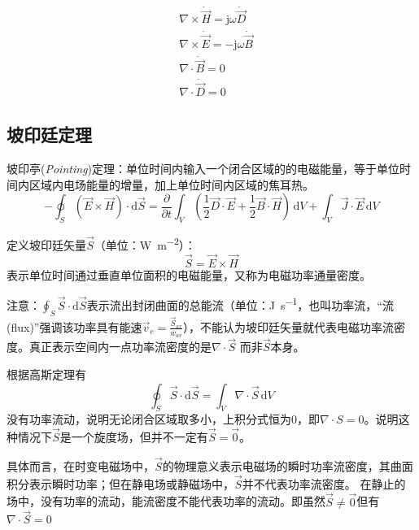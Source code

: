     \begin{subequations}
        \begin{align}
            &\nabla\times \dot{\vec{H}}=\mathrm{j}\omega \dot{\vec{D}} \\
            &\nabla\times \dot{\vec{E}}=-\mathrm{j}\omega \dot{\vec{B}} \\
            &\nabla\cdot \dot{\vec{B}}=0\\            
            &\nabla\cdot \dot{\vec{D}}=0
        \end{align}
    \end{subequations}


    \subsection{坡印廷定理}
    坡印亭(\emph{Pointing})定理：单位时间内输入一个闭合区域的的电磁能量，等于单位时间内区域内电场能量的增量，加上单位时间内区域的焦耳热。
    \begin{equation}
        -\oint_S\left(\vec{E}\times \vec{H}\right)\cdot \mathrm{d}\vec{S}
        =\frac{\partial }{\partial t}\int_V (\frac{1}{2}\vec{D}\cdot \vec{E}+\frac{1}{2}\vec{B}\cdot \vec{H})\,\mathrm{d}V
        +\int_V \vec{J}\cdot \vec{E}\,\mathrm{d}V
    \end{equation}

    定义坡印廷矢量$\vec{S}$（单位：\si{\watt\per\square\metre}）：
    \begin{equation}
        \vec{S}=\vec{E}\times\vec{H}
    \end{equation}
    表示{\color{red}单位时间通过垂直单位面积的电磁能量}，又称为{\color{red}电磁功率通量密度}。

    \vspace{5pt}
    \noindent\begin{boxedminipage}{\textwidth}
        \vspace{3pt}\setlength{\parindent}{2\ccwd}
        注意：$\oint_S \vec{S} \cdot \mathrm{d}\vec{S}$表示流出封闭曲面的总能流（单位：\si{\joule\per\second}，也叫功率流，“流(flux)”强调该功率具有能速$\vec{v}_e=\frac{{\vec{S}}_{av}}{w_{av}}$），不能认为坡印廷矢量就代表电磁功率流密度。真正{\color{red}表示空间内一点功率流密度的是$\nabla\cdot \vec{S}$ } 而非$\vec{S}$本身。
        
        根据高斯定理有
        \begin{equation}
            \oint_S \vec{S} \cdot \mathrm{d}\vec{S}=\int_V \nabla\cdot \vec{S}\,\mathrm{d}V
        \end{equation}
        没有功率流动，说明无论闭合区域取多小，上积分式恒为0，即$\nabla·S=0$。说明这种情况下$\vec{S}$是一个旋度场，但并不一定有$\vec{S}=\vec{0}$。


        具体而言，在时变电磁场中，$\vec{S}$的物理意义表示电磁场的瞬时功率流密度，其曲面积分表示瞬时功率；但在静电场或静磁场中，$\vec{S}$并不代表功率流密度。
        {在静止的场中，没有功率的流动，能流密度不能代表功率的流动。}即虽然$\vec{S}\neq \vec{0}$但有$\nabla\cdot\vec{S}=0$
        \vspace{3pt}
    \end{boxedminipage}
    \vspace{5pt}


